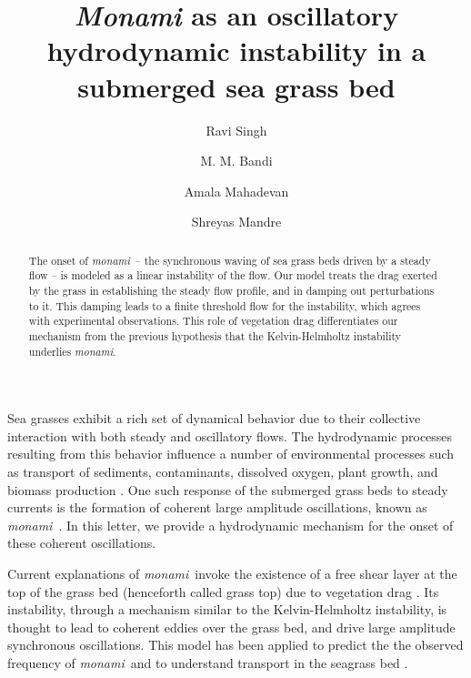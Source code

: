 \documentclass[aps,prl,twocolumn,superscriptaddress,sort&compress,10pt]{revtex4-1}  %
\newcommand{\monami}{\textit{monami}}
\begin{document}
\title{\textit{Monami} as an oscillatory hydrodynamic instability in a submerged sea grass bed}
\author{Ravi Singh}
\author{M. M. Bandi}
\author{Amala Mahadevan}
\author{Shreyas Mandre}

\begin{abstract}
The onset of \monami ~-- the synchronous waving of sea grass beds driven by a steady flow -- is modeled as a linear instability of the flow. Our model treats the drag exerted by the grass in establishing the steady flow profile, and in damping out perturbations to it. This damping leads to a finite threshold flow for the instability, which agrees with experimental observations. This role of vegetation drag differentiates our mechanism from the previous hypothesis that the Kelvin-Helmholtz instability underlies \monami.
\end{abstract}

\maketitle
Sea grasses exhibit a rich set of dynamical behavior due to their collective interaction with both steady and oscillatory flows.  
The hydrodynamic processes resulting from this behavior influence a number of environmental processes such as transport of sediments, contaminants, dissolved oxygen, plant growth, and biomass production  \cite{Fonseca87,Grizzle96,Nepf99,Nepf2012}. 
One such response of the submerged grass beds to steady currents is the formation of coherent large amplitude oscillations, known as \monami ~\cite{AckermanOkubo93}.  
In this letter, we provide a hydrodynamic mechanism for the onset of these coherent oscillations.

Current explanations of \monami ~invoke the existence of a free shear layer at the top of the grass bed (henceforth called grass top) due to vegetation drag  \cite{Ghisal02,Raupach96}. 
Its instability, through a mechanism similar to the Kelvin-Helmholtz instability, is thought to lead to coherent eddies over the grass bed, and drive large amplitude synchronous oscillations.
This model has been applied to predict the the observed frequency of \monami~and to understand transport in the seagrass bed \cite{Nepf00,Ghisal02,Nepf04}.
\end{document}
